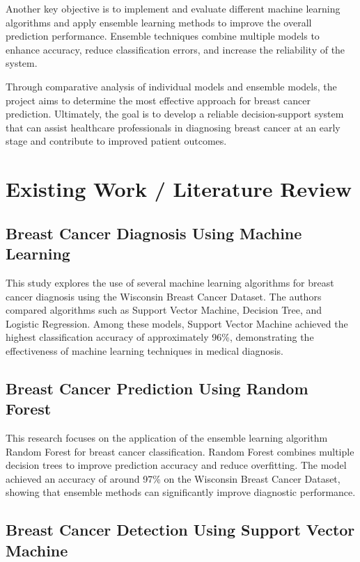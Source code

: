 \documentclass[12pt]{article}
\begin{document}
Another key objective is to implement and evaluate different machine learning algorithms and apply ensemble learning methods to improve the overall prediction performance. Ensemble techniques combine multiple models to enhance accuracy, reduce classification errors, and increase the reliability of the system.

Through comparative analysis of individual models and ensemble models, the project aims to determine the most effective approach for breast cancer prediction. Ultimately, the goal is to develop a reliable decision-support system that can assist healthcare professionals in diagnosing breast cancer at an early stage and contribute to improved patient outcomes.

\newpage
\section{Existing Work / Literature Review}

\subsection{Breast Cancer Diagnosis Using Machine Learning}

This study explores the use of several machine learning algorithms for breast cancer diagnosis using the Wisconsin Breast Cancer Dataset. The authors compared algorithms such as Support Vector Machine, Decision Tree, and Logistic Regression. Among these models, Support Vector Machine achieved the highest classification accuracy of approximately 96\%, demonstrating the effectiveness of machine learning techniques in medical diagnosis.

\subsection{Breast Cancer Prediction Using Random Forest}

This research focuses on the application of the ensemble learning algorithm Random Forest for breast cancer classification. Random Forest combines multiple decision trees to improve prediction accuracy and reduce overfitting. The model achieved an accuracy of around 97\% on the Wisconsin Breast Cancer Dataset, showing that ensemble methods can significantly improve diagnostic performance.

\subsection{Breast Cancer Detection Using Support Vector Machine}
\end{document}
